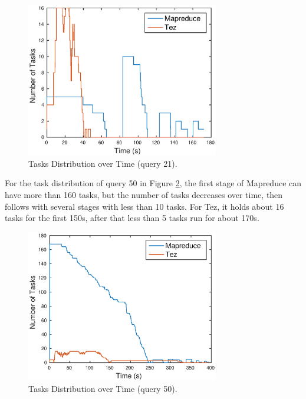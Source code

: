\documentclass[10pt]{article}
\begin{document}
\begin{figure}
\begin{center}
\includegraphics[width=0.75\textwidth]{pic/q1c_task_distribution_21}
\caption{Tasks Distribution over Time (query 21).}
\label{fig:q1c_tasks_21}
\end{center}
\end{figure}

For the task distribution of query 50 in Figure \ref{fig:q1c_tasks_50}, the first stage of Mapreduce can have more than 160 tasks, but the number of tasks decreases over time, then follows with several stages with less than 10 tasks. For Tez, it holds about 16 tasks for the first 150s, after that less than 5 tasks run for about 170s. 

\begin{figure}
\begin{center}
\includegraphics[width=0.75\textwidth]{pic/q1c_task_distribution_50}
\caption{Tasks Distribution over Time (query 50).}
\label{fig:q1c_tasks_50}
\end{center}
\end{figure}
\end{document}
